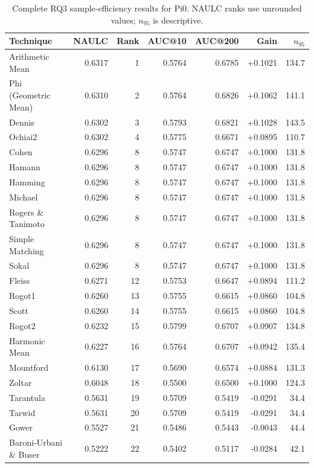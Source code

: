 \begin{table}[t]
\centering
\caption{Complete RQ3 sample-efficiency results for Pi0. NAULC ranks use unrounded values; $n_{95}$ is descriptive.}
\label{tab:rq3v2-efficiency-pi0}
{\scriptsize
\setlength{\tabcolsep}{6pt}
\begin{tabular}{lrrrrrr}
\toprule
Technique & NAULC & Rank & AUC@10 & AUC@200 & Gain & $n_{95}$ \\
\midrule
Arithmetic Mean & 0.6317 & 1 & 0.5764 & 0.6785 & +0.1021 & 134.7 \\
Phi (Geometric Mean) & 0.6310 & 2 & 0.5764 & 0.6826 & +0.1062 & 141.1 \\
Dennis & 0.6302 & 3 & 0.5793 & 0.6821 & +0.1028 & 143.5 \\
Ochiai2 & 0.6302 & 4 & 0.5775 & 0.6671 & +0.0895 & 110.7 \\
Cohen & 0.6296 & 8 & 0.5747 & 0.6747 & +0.1000 & 131.8 \\
Hamann & 0.6296 & 8 & 0.5747 & 0.6747 & +0.1000 & 131.8 \\
Hamming & 0.6296 & 8 & 0.5747 & 0.6747 & +0.1000 & 131.8 \\
Michael & 0.6296 & 8 & 0.5747 & 0.6747 & +0.1000 & 131.8 \\
Rogers \& Tanimoto & 0.6296 & 8 & 0.5747 & 0.6747 & +0.1000 & 131.8 \\
Simple Matching & 0.6296 & 8 & 0.5747 & 0.6747 & +0.1000 & 131.8 \\
Sokal & 0.6296 & 8 & 0.5747 & 0.6747 & +0.1000 & 131.8 \\
Fleiss & 0.6271 & 12 & 0.5753 & 0.6647 & +0.0894 & 111.2 \\
Rogot1 & 0.6260 & 13 & 0.5755 & 0.6615 & +0.0860 & 104.8 \\
Scott & 0.6260 & 14 & 0.5755 & 0.6615 & +0.0860 & 104.8 \\
Rogot2 & 0.6232 & 15 & 0.5799 & 0.6707 & +0.0907 & 134.8 \\
Harmonic Mean & 0.6227 & 16 & 0.5764 & 0.6707 & +0.0942 & 135.4 \\
Mountford & 0.6130 & 17 & 0.5690 & 0.6574 & +0.0884 & 131.3 \\
Zoltar & 0.6048 & 18 & 0.5500 & 0.6500 & +0.1000 & 124.3 \\
Tarantula & 0.5631 & 19 & 0.5709 & 0.5419 & -0.0291 & 34.4 \\
Tarwid & 0.5631 & 20 & 0.5709 & 0.5419 & -0.0291 & 34.4 \\
Gower & 0.5527 & 21 & 0.5486 & 0.5443 & -0.0043 & 44.4 \\
Baroni-Urbani \& Buser & 0.5222 & 22 & 0.5402 & 0.5117 & -0.0284 & 42.1 \\

\end{tabular}}
\end{table}
